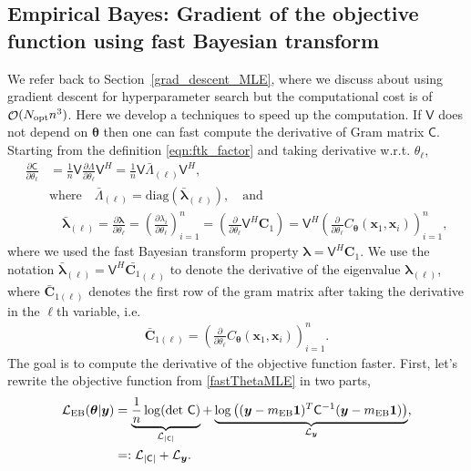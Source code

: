 \documentclass{svjour3}                     %
\DeclareMathOperator{\Order}{{\mathcal O}}
\newcommand{\bm}[1]{\boldsymbol{#1}}
\newcommand{\vlambda}{{\bm{\lambda}}}
\newcommand{\vtheta}{{\bm{\theta}}}
\newcommand{\vC}{\bm{C}}
\newcommand{\vx}{\bm{x}}
\newcommand{\vy}{\bm{y}}
\newcommand{\vone}{\bm{1}}
\newcommand{\mC}{\mathsf{C}}
\newcommand{\mCInv}{\mathsf{C}^{-1}}
\newcommand{\opt}{{\textup{opt}}}
\newcommand{\mLambda}{\mathsf{\Lambda}}
\newcommand{\mV}{\mathsf{V}}
\newcommand{\MLE}{\textup{EB}}
\newcommand{\diag}{\text{diag}}
\def\abs#1{\ensuremath{\left \lvert #1 \right \rvert}}
\begin{document}
\iffalse

\subsection{Empirical Bayes: Gradient of the objective function using fast Bayesian transform} \label{deriv_obj_func_MLE} 
We refer back to Section~\ref{grad_descent_MLE}, where we discuss about using gradient descent for hyperparameter search but the computational cost is of $\Order(N_{\opt} n^3)$. Here we develop a techniques to speed up the computation.
If $\mV$ does not depend on $\vtheta$ then one can fast compute the derivative of Gram matrix $\mC$. Starting from the definition \eqref{eqn:ftk_factor} and taking derivative w.r.t. $\theta_\ell$, 
\begin{align}
\nonumber
\displaystyle \frac{\partial \mC}{\partial \theta_\ell} 
& = \frac 1n \mV \frac{\partial {\mLambda}}{\partial \theta_\ell} \mV^H
= \frac 1n \mV \bar{\mLambda}_{(\ell)} \mV^H,
\\
\nonumber
& \text{where} \quad \bar{\mLambda}_{(\ell)} = \diag(\bar{\vlambda}_{(\ell)}), \quad \text{and}
\\
\label{eqn:deriv_eigenval_gram_matrix}
&  \quad \bar{\vlambda}_{(\ell)} = \frac{\partial \vlambda}{\partial \theta_\ell} = \left( \frac{\partial \lambda_i}{\partial \theta_\ell} \right)_{i=1}^n 
= \left( \frac{\partial }{\partial \theta_\ell} \mV^H {\vC_1} \right)
= \mV^H \left( \frac{\partial }{\partial \theta_\ell} {C_\vtheta(\vx_1,\vx_i)} \right)_{i=1}^n,
\end{align}
where we used the fast Bayesian transform property $\vlambda 
= \mV^H \vC_1$. %
We use the notation $\bar{\vlambda}_{(\ell)} = \mV^H \bar{\vC_1}_{(\ell)}$ to denote the derivative of the eigenvalue ${\vlambda}_{(\ell)}$,  where $\bar{\vC}_{1(\ell)}$ denotes the first row of the gram matrix after taking the derivative in the $\ell$th variable, i.e.
\begin{align*}
\bar{\vC}_{1{(\ell)}} = \left(\frac{\partial }{\partial{\theta}_\ell} C_\vtheta(\vx_1,\vx_i) \right)_{i=1}^n.
\end{align*}
The goal is to compute the derivative of the objective function faster. First, let's rewrite the objective function from \eqref{fastThetaMLE} in two parts,
\begin{align*}
\mathcal{L}_{\MLE}(\vtheta | \vy) &= 
\underbrace{\frac{1}{n}  \log(\det\, \mC)}_{\mathcal{L}_{\abs{\mC}}} + \underbrace{\log\left((\vy-m_\MLE\vone)^T\mCInv(\vy-m_\MLE\vone) \right)}_{\mathcal{L}_{\vy}},
\\ &=: \mathcal{L}_{\abs{\mC}} + \mathcal{L}_{\vy}.
\end{align*}
\end{document}
